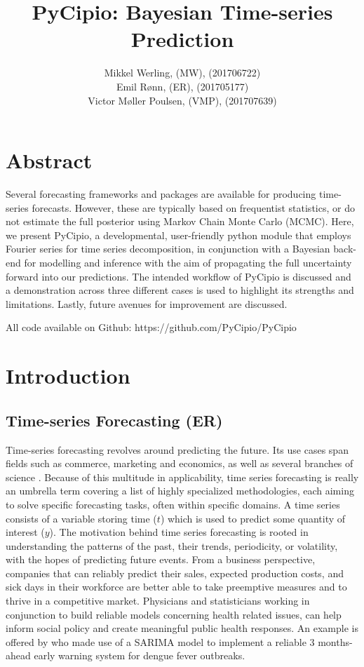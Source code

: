 \documentclass{article}
\title{PyCipio: Bayesian Time-series Prediction}
\author{Mikkel Werling, (MW), (201706722) \\
    Emil Rønn, (ER), (201705177) \\
    Victor Møller Poulsen, (VMP), (201707639)}
\date{}
\begin{document}
\maketitle
\section{Abstract}
Several forecasting frameworks and packages are available for producing time-series forecasts. However, these are typically based on frequentist statistics, or do not estimate the full posterior using Markov Chain Monte Carlo (MCMC). Here, we present PyCipio, a developmental, user-friendly python module that employs Fourier series for time series decomposition, in conjunction with a Bayesian back-end for modelling and inference with the aim of propagating the full uncertainty forward into our predictions. The intended workflow of PyCipio is discussed and a demonstration across three different cases is used to highlight its strengths and limitations. Lastly, future avenues for improvement are discussed.     

All code available on Github: https://github.com/PyCipio/PyCipio
\section{Introduction}
\subsection{Time-series Forecasting (ER)}

Time-series forecasting revolves around predicting the future. Its use cases span fields such as commerce, marketing and economics, as well as several branches of science \cite{Chatfield}. Because of this multitude in applicability, time series forecasting is really an umbrella term covering a list of highly specialized methodologies, each aiming to solve specific forecasting tasks, often within specific domains. A time series consists of a variable storing time ($t$) which is used to predict some quantity of interest ($y$). The motivation behind time series forecasting is rooted in understanding the patterns of the past, their trends, periodicity, or volatility, with the hopes of predicting future events. From a business perspective, companies that can reliably predict their sales, expected production costs, and sick days in their workforce are better able to take preemptive measures and to thrive in a competitive market. Physicians and statisticians working in conjunction to build reliable models concerning health related issues, can help inform social policy and create meaningful public health responses. An example is offered by  who made use of a SARIMA model to implement a reliable 3 months-ahead early warning system for dengue fever outbreaks.
\end{document}
